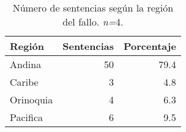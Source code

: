 \begin{table}[H]
\centering
\caption{Número de sentencias según la región del fallo. \textit{n=}4.} 
\label{tab:regfal}
\begin{tabular}{lrr}
  \hline
Región & Sentencias & Porcentaje \\ 
  \hline
Andina & 50 & 79.4 \\ 
  Caribe &  3 & 4.8 \\ 
  Orinoquia &  4 & 6.3 \\ 
  Pacifica &  6 & 9.5 \\ 
   \hline
\end{tabular}
\end{table}
